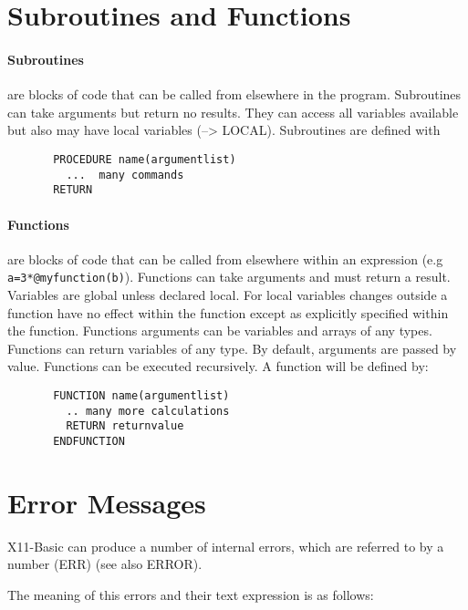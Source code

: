 \section{Subroutines and Functions}
\paragraph{Subroutines}
are  blocks  of  code that can be called from
elsewhere in the program.  Subroutines can  take  arguments
but  return  no  results.  They  can  access all variables
available but also may have local variables  (-->  LOCAL).
Subroutines are defined with
\begin{verbatim}
       PROCEDURE name(argumentlist)
         ...  many commands
       RETURN
\end{verbatim}

\paragraph{Functions}
are blocks of code that can be called from elsewhere 
within an expression (e.g \verb|a=3*@myfunction(b)|).  Functions  can take
arguments and must return a result.  Variables are global unless declared 
local. For local variables changes outside a function have no effect within
the function except as explicitly specified within the function. Functions 
arguments can be variables and arrays of any types. Functions can return 
variables of any type. By default, arguments are passed by value. Functions
can be executed recursively. A function will be defined by:
\begin{verbatim}
       FUNCTION name(argumentlist)
         .. many more calculations
         RETURN returnvalue
       ENDFUNCTION
\end{verbatim}

\section{Error Messages}
\label{errors}

X11-Basic can produce a number of internal errors, which are referred 
to by a number (ERR) (see also ERROR).

The meaning of this errors and their text expression is as follows:

\begin{tabbing}

\end{tabbing}
